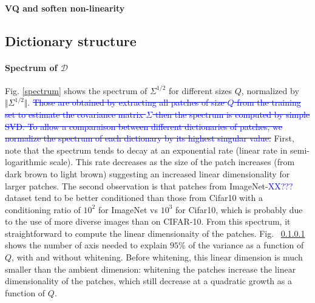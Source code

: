 \documentclass{article}
\newcommand{\Edouard}[1]{\textcolor{blue}{#1}}
\begin{document}
{\paragraph{VQ and soften non-linearity}
\subsection{Dictionary structure}
\label{structure}
\paragraph{Spectrum of $\mathcal{D}$}
Fig. \ref{spectrum} shows the spectrum of $\Sigma^{1/2}$ for different sizes $Q$, normalized by $\Vert \Sigma^{1/2}\Vert$. \Edouard{\sout{Those are obtained by extracting all patches of size $Q$ from the training set to estimate the  covariance matrix $\Sigma$ then the spectrum is computed by simple SVD. To allow a comparaison between different dictionaries of patches, we normalize the spectrum of each dictionary by its highest singular value.}} First, note that the spectrum tends to decay at an exponential rate (linear rate in semi-logarithmic scale). This rate decreases as the size of the patch increases (from dark brown to light brown) suggesting an increased linear dimensionality for larger patches. The second observation is that patches from ImageNet-\Edouard{XX???} dataset tend to be better conditioned than those from Cifar10 with a conditioning ratio of $10^2$ for ImageNet vs $10^3$ for Cifar10, which is probably due to the use of more diverse images than on CIFAR-10. From this spectrum, it straightforward to compute the linear dimensionaity of the patches. Fig.
~\ref{} shows the number of axis needed to explain $95\%$ of the variance as a function of $Q$, with and without whitening. Before whitening, this linear dimension is much smaller than the ambient dimension: whitening the patches increase the linear dimensionality of the patches, which still decrease at a quadratic growth as a function of $Q$.

}
\end{document}
